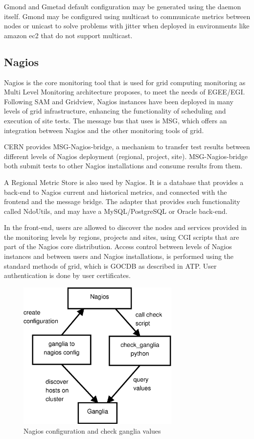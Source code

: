 Gmond and Gmetad default configuration may be generated using the daemon itself. Gmond may be configured using multicast to communicate metrics between nodes or unicast to solve problems with jitter when deployed in environments like amazon ec2 that do not support multicast.

\subsection{Nagios}

Nagios is the core monitoring tool that is used for grid computing monitoring as Multi Level Monitoring architecture proposes, to meet the needs of EGEE/EGI. Following SAM and Gridview, Nagios instances have been deployed in many levels of grid infrastructure, enhancing the functionality of scheduling and execution of site tests. The message bus that uses is MSG, which offers an integration between Nagios and the other monitoring tools of grid.

CERN provides MSG-Nagios-bridge, a mechanism to transfer test results between different levels of Nagios deployment (regional, project, site). MSG-Nagios-bridge both submit tests to other Nagios installations and consume results from them. 

A Regional Metric Store is also used by Nagios. It is a database that provides a back-end to Nagios current and historical metrics, and connected with the frontend and the message bridge. The adapter that provides such functionality called NdoUtils, and may have a MySQL/PostgreSQL or Oracle back-end.

In the front-end, users are allowed to discover the nodes and services provided in the monitoring levels by regions, projects and sites, using CGI scripts that are part of the Nagios core distribution. Access control between levels of Nagios instances and between users and Nagios installations, is performed using the standard methods of grid, which is GOCDB as described in ATP. User authentication is done by user certificates.

\begin{figure}[htb]
\centering
 \includegraphics[width=80mm]{images/nagios_check_ganglia.eps}
\caption{Nagios configuration and check ganglia values}
\label{figure:nagios_ganglia}
\end{figure}

